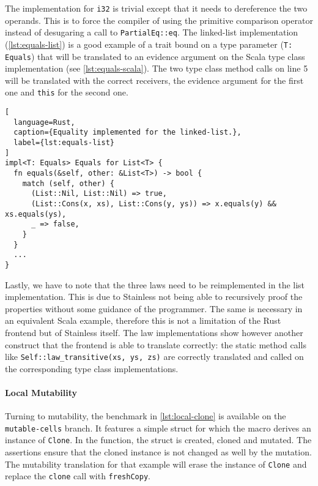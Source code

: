 The implementation for \lstinline!i32! is trivial except that it needs to
dereference the two operands. This is to force the compiler of using the
primitive comparison operator instead of desugaring a call to
\lstinline!PartialEq::eq!. The linked-list implementation
(\autoref{lst:equals-list}) is a good example of a trait bound on a type
parameter (\lstinline!T: Equals!) that will be translated to an evidence
argument on the Scala type class implementation (see
\autoref{lst:equals-scala}). The two type class method calls on line 5 will be
translated with the correct receivers, the evidence argument for the first one
and \lstinline!this! for the second one.

\begin{lstlisting}[
  language=Rust,
  caption={Equality implemented for the linked-list.},
  label={lst:equals-list}
]
impl<T: Equals> Equals for List<T> {
  fn equals(&self, other: &List<T>) -> bool {
    match (self, other) {
      (List::Nil, List::Nil) => true,
      (List::Cons(x, xs), List::Cons(y, ys)) => x.equals(y) && xs.equals(ys),
      _ => false,
    }
  }
  ...
}
\end{lstlisting}

Lastly, we have to note that the three laws need to be reimplemented in the list
implementation. This is due to Stainless not being able to recursively proof the
properties without some guidance of the programmer. The same is necessary in an
equivalent Scala example, therefore this is not a limitation of the Rust
frontend but of Stainless itself. The law implementations show however another
construct that the frontend is able to translate correctly: the static method
calls like \lstinline!Self::law_transitive(xs, ys, zs)! are correctly translated
and called on the corresponding type class implementations.

\paragraph{Local Mutability}

Turning to mutability, the benchmark in \autoref{lst:local-clone} is available
on the \texttt{mutable-cells} branch. It features a simple struct for which the
macro derives an instance of \lstinline!Clone!. In the function, the struct is
created, cloned and mutated. The assertions ensure that the cloned instance is
not changed as well by the mutation. The mutability translation for that example
will erase the instance of \lstinline!Clone! and replace the \lstinline!clone!
call with \lstinline!freshCopy!.

